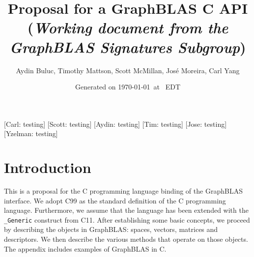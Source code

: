 \documentclass[11pt]{extarticle}
\begin{document}
\title{Proposal for a GraphBLAS C API\\ (\emph{\large Working document from the \emph{GraphBLAS} Signatures Subgroup})}
\author{Aydin Buluc, Timothy Mattson, Scott McMillan, Jos\'e Moreira, Carl Yang}
\date{Generated on \today\ at \currenttime\ EDT}

\renewcommand{\vector}[1]{{\bf #1}}
\renewcommand{\matrix}[1]{{\bf #1}}
\newcommand{\zip}{{\mbox{zip}}}
\newcommand{\zap}{{\mbox{zap}}}
\newcommand{\ewiseadd}{{\mbox{\bf ewiseadd}}}
\newcommand{\ewisemult}{{\mbox{\bf ewisemult}}}
\newcommand{\mxm}{{\mbox{\bf mxm}}}
\newcommand{\vxm}{{\mbox{\bf vxm}}}
\newcommand{\mxv}{{\mbox{\bf mxv}}}
\newcommand{\gpit}[1]{{\sf #1}}
\newcommand{\ie}{\emph{i.e.}}
\newcommand{\nan}{{\sf NaN}}
\newcommand{\nil}{{\bf nil}}
\newcommand{\ifif}{{\bf if}}
\newcommand{\ifthen}{{\bf then}}
\newcommand{\ifelse}{{\bf else}}
\newcommand{\ifendif}{{\bf endif}}
\newcommand{\zero}{{\bf 0}}
\newcommand{\one}{{\bf 1}}

\newcommand{\aydin}[1]{{{\color{orange}[Aydin: #1]}}}
\newcommand{\scott}[1]{{{\color{violet}[Scott: #1]}}}
\newcommand{\tim}[1]{{{\color{teal}[Tim: #1]}}}
\newcommand{\jose}[1]{{{\color{red}[Jose: #1]}}}
\newcommand{\carl}[1]{{{\color{blue}[Carl: #1]}}}
\newcommand{\ajy}[1]{{{\color{brown}[Yzelman: #1]}}}

\setlength{\parskip}{0.5\baselineskip}
\setlength{\parindent}{0ex}

\maketitle

\carl{testing}
\scott{testing}
\aydin{testing}
\tim{testing}
\jose{testing}
\ajy{testing}

\section{Introduction}

This is a proposal for the C programming language binding of the
GraphBLAS interface. We adopt C99 as the standard definition of the C
programming language.  Furthermore, we assume that the language has been
extended with the {\tt \_Generic} construct from C11.  After establishing
some basic concepts, we proceed by describing the objects in GraphBLAS:
spaces, vectors, matrices and descriptors. We then describe the various
methods that operate on those objects. The appendix includes examples
of GraphBLAS in C.
\end{document}
